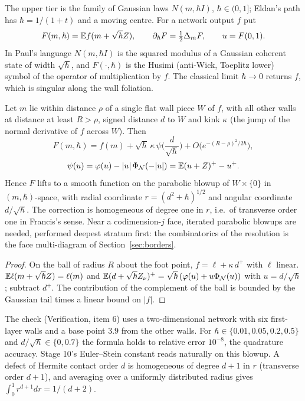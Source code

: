 \label{sec:deformation}
The upper tier is the family of Gaussian laws $N(m,\hbar I)$, $\hbar\in(0,1]$; Eldan's path has $\hbar=1/(1+t)$ and a moving centre. For a
network output $f$ put
\[
F(m,\hbar)=\mathbb E f(m+\sqrt\hbar Z),\qquad \partial_\hbar F=\tfrac12\Delta_mF,\qquad u=F(0,1).
\]
In Paul's language $N(m,\hbar I)$ is the squared modulus of a Gaussian coherent state of width $\sqrt\hbar$, and $F(\cdot,\hbar)$ is the Husimi
(anti-Wick, Toeplitz lower) symbol of the operator of multiplication by $f$. The classical limit $\hbar\to0$ returns $f$, which is
singular along the wall foliation.

\begin{theorem}\label{thm:layer}
Let $m$ lie within distance $\rho$ of a single flat wall piece $W$ of $f$, with all other walls at distance at least $R>\rho$, signed distance
$d$ to $W$ and kink $\kappa$ (the jump of the normal derivative of $f$ across $W$). Then
\[
F(m,\hbar)=f(m)+\sqrt\hbar\,\kappa\,\psi\!\Big(\frac d{\sqrt\hbar}\Big)+O\big(e^{-(R-\rho)^2/2\hbar}\big),
\]
\[
\psi(u)=\varphi(u)-|u|\,\Phi_{\mathcal N}(-|u|)=\mathbb E(u+Z)^+-u^+ .
\]
Hence $F$ lifts to a smooth function on the parabolic blowup of $W\times\{0\}$ in $(m,\hbar)$-space, with radial coordinate
$r=(d^2+\hbar)^{1/2}$ and angular coordinate $d/\sqrt\hbar$. The correction is homogeneous of degree one in $r$, i.e.\ of transverse
order one in Francis's sense. Near a codimension-$j$ face, iterated parabolic blowups are needed, performed deepest stratum first:
the combinatorics of the resolution is the face multi-diagram of Section~\ref{sec:borders}.
\end{theorem}
\begin{proof}
On the ball of radius $R$ about the foot point, $f=\ell+\kappa\,d^+$ with $\ell$ linear. $\mathbb E\ell(m+\sqrt\hbar Z)=\ell(m)$ and
$\mathbb E(d+\sqrt\hbar Z_\nu)^+=\sqrt\hbar\,(\varphi(u)+u\Phi_{\mathcal N}(u))$ with $u=d/\sqrt\hbar$; subtract $d^+$. The contribution of the complement of the ball
is bounded by the Gaussian tail times a linear bound on $|f|$.
\end{proof}
The check (Verification, item 6) uses a two-dimensional network with six first-layer walls and a base point $3.9$ from the other walls.
For $\hbar\in\{0.01,0.05,0.2,0.5\}$ and $d/\sqrt\hbar\in\{0,0.7\}$ the formula holds to relative error $10^{-8}$, the quadrature accuracy.
Stage 10's Euler--Stein constant reads naturally on this blowup. A defect of Hermite contact order $d$ is homogeneous of degree $d+1$ in
$r$ (transverse order $d+1$), and averaging over a uniformly distributed radius gives $\int_0^1r^{d+1}dr=1/(d+2)$.

